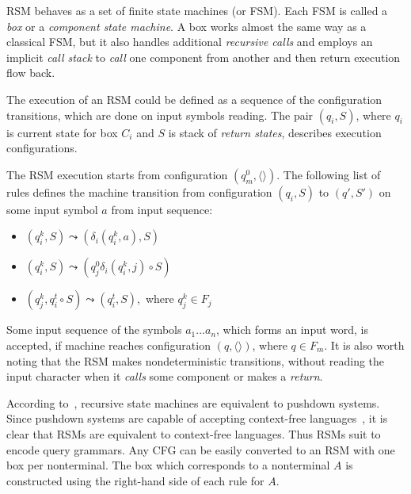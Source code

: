 RSM behaves as a set of finite state machines (or FSM).
Each FSM is called a \textit{box} or a \textit{component state machine}.
A box works almost the same way as a classical FSM, but it also handles additional \textit{recursive calls} and employs an implicit \textit{call stack} to \textit{call} one component from another and then return execution flow back.

The execution of an RSM could be defined as a sequence of the configuration transitions, which are done on input symbols reading.
The pair $(q_i,S)$, where $q_i$ is current state for box $C_i$ and $S$ is stack of \textit{return states}, describes execution configurations.

The RSM execution starts from configuration $(q_m^0, \langle\rangle)$.
The following list of rules defines the machine transition from configuration $(q_i,S)$ to $(q',S')$ on some input symbol $a$ from input sequence:
\begin{itemize}
    \item $(q_i^k,S) \leadsto (\delta_i (q_i^k, a),S)$
    \item $(q_i^k,S) \leadsto (q_j^0\delta_i (q_i^k, j) \circ S)$
    \item $(q_j^k,q_i^t\circ S) \leadsto (q_i^t, S),$ where $q_j^k \in F_j$
\end{itemize}

Some input sequence of the symbols $a_1 ... a_n$, which forms an input word, is accepted, if machine reaches configuration $(q,\langle\rangle)$, where $q \in F_m$. It is also worth noting that the RSM makes nondeterministic transitions, without reading the input character when it \textit{calls} some component or  makes a \textit{return}.

According to~\cite{rsm:analysis:10.1007/3-540-44585-4_18}, recursive state machines are equivalent to pushdown systems.
Since pushdown systems are capable of accepting context-free languages~\cite{automata:theory:10.5555/1177300}, it is clear that RSMs are equivalent to context-free languages.
Thus RSMs suit to encode query grammars.
Any CFG can be easily converted to an RSM with one box per nonterminal.
The box which corresponds to a nonterminal $A$ is constructed using the right-hand side of each rule for $A$.

